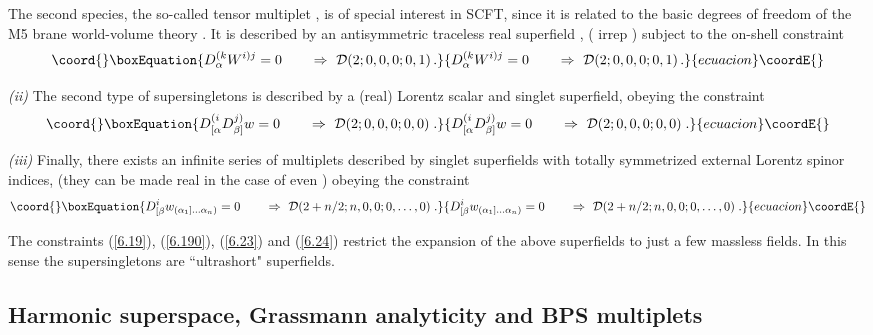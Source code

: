 \documentclass[a4paper,11pt]{article}
\begin{document}
The second species, the so-called  \coordHE{} tensor multiplet
\cite{HST,bsvp}, is of special interest in \coordHE{} SCFT, since it is
related to the basic degrees of freedom of the M5 brane
world-volume theory \cite{AGMOO}. It is described by an
antisymmetric traceless real superfield
\coordHE{}, \coordHE{}
(\coordHE{} irrep \myHighlight{$[0,1]$}\coordHE{}) subject to the on-shell constraint
\begin{equation}\coord{}\boxEquation{\label{6.190}
  D^{(k}_\alpha W^{i)j}=0 \qquad \Rightarrow \ {\cal
D}(2;0,0,0;0,1) \,.
}{D^{(k}_\alpha W^{i)j}=0 \qquad \Rightarrow \ {\cal
D}(2;0,0,0;0,1) \,.
}{ecuacion}\coordE{}\end{equation}


{\sl (ii)} The second type of supersingletons is described by a (real) Lorentz
scalar and \coordHE{} singlet superfield, \coordHE{} obeying the
constraint
\begin{equation}\coord{}\boxEquation{\label{6.23}
 D^{(i}_{[\alpha} D^{j)}_{\beta]} w = 0 \qquad \Rightarrow \ {\cal
D}(2;0,0,0;0,0)\;.
}{D^{(i}_{[\alpha} D^{j)}_{\beta]} w = 0 \qquad \Rightarrow \ {\cal
D}(2;0,0,0;0,0)\;.
}{ecuacion}\coordE{}\end{equation}

{\sl (iii)} Finally, there exists an infinite series of multiplets described by
\coordHE{} singlet superfields with \coordHE{} totally symmetrized external
Lorentz spinor indices, \coordHE{} (they can be
made real in the case of even \coordHE{}) obeying the constraint
\begin{equation}\coord{}\boxEquation{\label{6.24}
  D^i_{[\beta}w_{(\alpha_1]\ldots\alpha_n)} = 0 \qquad \Rightarrow \ {\cal
D}(2+n/2;n,0,0;0,\ldots,0)\;.
}{D^i_{[\beta}w_{(\alpha_1]\ldots\alpha_n)} = 0 \qquad \Rightarrow \ {\cal
D}(2+n/2;n,0,0;0,\ldots,0)\;.
}{ecuacion}\coordE{}\end{equation}

The constraints (\ref{6.19}), (\ref{6.190}), (\ref{6.23}) and (\ref{6.24})
restrict the \myHighlight{$\theta$}\coordHE{} expansion of the above superfields to just a few massless
fields. In this sense the supersingletons are ``ultrashort" superfields.

\subsection{Harmonic superspace, Grassmann analyticity and BPS multiplets}
\end{document}
